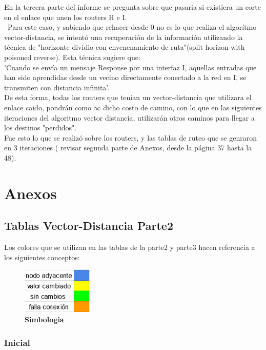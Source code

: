 \documentclass[12pt]{article}
\begin{document}
	En la tercera parte del informe se pregunta sobre que pasaria si existiera 
un corte en el enlace que unen los routers H e I.\\\
	Para este caso, y sabiendo que rehacer desde 0 no es lo que realiza el algorítmo vector-distancia, se intentó una recuperación de la información utilizando la técnica de "horizonte dividio con envenenamiento de ruta"(split horizon with poisoned reverse). Esta técnica sugiere que:\\
	'Cuando se envía un mensaje Response por una interfaz I, aquellas entradas que han sido aprendidas desde un vecino directamente conectado a la red en I, se transmiten con distancia infinita'.\\
	De esta forma, todas los routers que tenian un vector-distancia que utilizara el enlace caido, pondrán como  $\infty$ dicho costo de camino, con lo que en las siguientes iteraciones del algoritmo vector distancia, utilizarán otros caminos para llegar a los destinos "perdidos".\\
	
	Fue esto lo que se realizó sobre los routers, y las tablas de ruteo que se genraron en 3 iteraciones ( revisar segunda parte de Anexos, desde la página 37 hasta la 48).\\

\newpage
\section{Anexos}
 
\subsection{Tablas Vector-Distancia Parte2}
Los colores que se utilizan en las tablas de la parte2 y parte3 hacen referencia a los siguientes conceptos:

\begin{figure}[H] 
\centering 
\includegraphics[width=0.3\textwidth]{imagenes/simbologia.png} \caption{\small \textbf{Simbologia}}
\label{fig:diagrama_6} 
\end{figure}

\subsubsection{Inicial}
\end{document}
